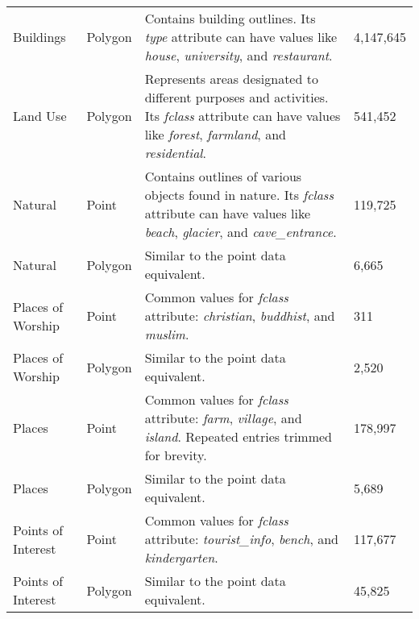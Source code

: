 \begin{longtable}{p{3cm}p{2cm}p{5.7cm}p{2.5cm}}
    Buildings          & Polygon       & Contains building outlines. Its \emph{type} attribute can have values like \emph{house}, \emph{university}, and \emph{restaurant}.                                                  & 4,147,645           \\
    Land Use           & Polygon       & Represents areas designated to different purposes and activities. Its \emph{fclass} attribute can have values like \emph{forest}, \emph{farmland}, and \emph{residential}.          & 541,452             \\
    Natural            & Point         & Contains outlines of various objects found in nature. Its \emph{fclass} attribute can have values like \emph{beach}, \emph{glacier}, and \emph{cave\_entrance}.                     & 119,725             \\
    Natural            & Polygon       & Similar to the point data equivalent.                                                                                                                                               & 6,665               \\
    Places of Worship  & Point         & Common values for \emph{fclass} attribute: \emph{christian}, \emph{buddhist}, and \emph{muslim}.                                                                                    & 311                 \\
    Places of Worship  & Polygon       & Similar to the point data equivalent.                                                                                                                                               & 2,520               \\
    Places             & Point         & Common values for \emph{fclass} attribute: \emph{farm}, \emph{village}, and \emph{island}. Repeated entries trimmed for brevity.                                                    & 178,997             \\
    Places             & Polygon       & Similar to the point data equivalent.                                                                                                                                               & 5,689               \\
    Points of Interest & Point         & Common values for \emph{fclass} attribute: \emph{tourist\_info}, \emph{bench}, and \emph{kindergarten}.                                                                             & 117,677             \\
    Points of Interest & Polygon       & Similar to the point data equivalent.                                                                                                                                               & 45,825              \\

\end{longtable}
